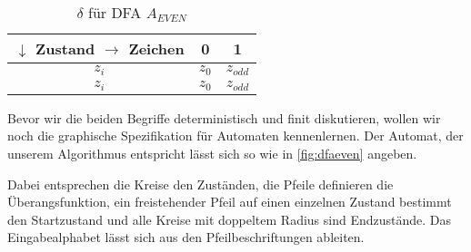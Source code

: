 \begin{table}[ht]
    \caption{$\delta$ für DFA $A_{EVEN}$}
    \centering
    \begin{tabular}{|c|c|c|}
    \hline
         $\downarrow$ Zustand \linebreak
         $\rightarrow$ Zeichen
        & 0
        & 1
        \\
        \hline
          $z_i$
        & $z_0$
        & $z_{odd}$
        \\
        \hline
          $z_i$
        & $z_0$
        & $z_{odd}$
        \\
        \hline
    \end{tabular}
    \label{tab:deltaeven}
\end{table}

Bevor wir die beiden Begriffe deterministisch und finit diskutieren,
wollen wir noch die graphische Spezifikation für Automaten kennenlernen. 
Der Automat,
der unserem Algorithmus entspricht lässt sich so wie in \autoref{fig:dfaeven} angeben.


Dabei entsprechen die Kreise den Zuständen,
die Pfeile definieren die Überangsfunktion,
ein freistehender Pfeil auf einen einzelnen Zustand bestimmt den Startzustand
und alle Kreise mit doppeltem Radius sind Endzustände.
Das Eingabealphabet lässt sich aus den Pfeilbeschriftungen ableiten.

